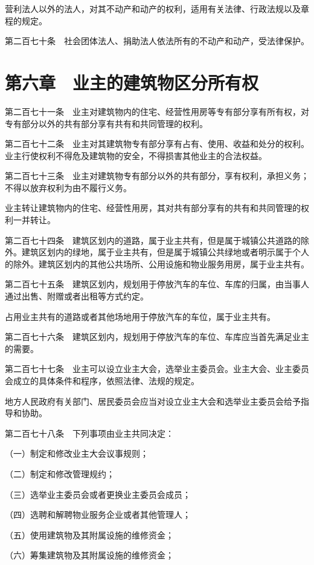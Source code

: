\documentclass[UTF8,12pt,a4paper]{ctexbook}
\begin{document}
营利法人以外的法人，对其不动产和动产的权利，适用有关法律、行政法规以及章程的规定。

第二百七十条　社会团体法人、捐助法人依法所有的不动产和动产，受法律保护。

\section*{第六章　业主的建筑物区分所有权}

第二百七十一条　业主对建筑物内的住宅、经营性用房等专有部分享有所有权，对专有部分以外的共有部分享有共有和共同管理的权利。

第二百七十二条　业主对其建筑物专有部分享有占有、使用、收益和处分的权利。业主行使权利不得危及建筑物的安全，不得损害其他业主的合法权益。

第二百七十三条　业主对建筑物专有部分以外的共有部分，享有权利，承担义务；不得以放弃权利为由不履行义务。

业主转让建筑物内的住宅、经营性用房，其对共有部分享有的共有和共同管理的权利一并转让。

第二百七十四条　建筑区划内的道路，属于业主共有，但是属于城镇公共道路的除外。建筑区划内的绿地，属于业主共有，但是属于城镇公共绿地或者明示属于个人的除外。建筑区划内的其他公共场所、公用设施和物业服务用房，属于业主共有。

第二百七十五条　建筑区划内，规划用于停放汽车的车位、车库的归属，由当事人通过出售、附赠或者出租等方式约定。

占用业主共有的道路或者其他场地用于停放汽车的车位，属于业主共有。

第二百七十六条　建筑区划内，规划用于停放汽车的车位、车库应当首先满足业主的需要。

第二百七十七条　业主可以设立业主大会，选举业主委员会。业主大会、业主委员会成立的具体条件和程序，依照法律、法规的规定。

地方人民政府有关部门、居民委员会应当对设立业主大会和选举业主委员会给予指导和协助。

第二百七十八条　下列事项由业主共同决定：

（一）制定和修改业主大会议事规则；

（二）制定和修改管理规约；

（三）选举业主委员会或者更换业主委员会成员；

（四）选聘和解聘物业服务企业或者其他管理人；

（五）使用建筑物及其附属设施的维修资金；

（六）筹集建筑物及其附属设施的维修资金；
\end{document}
